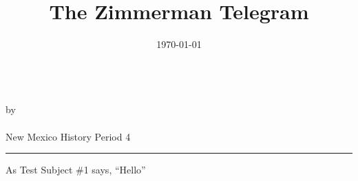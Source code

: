 \documentclass[12pt]{article}
\newcommand{\PutTitle}[1]
{
    \begin{center}
        {\huge\bfseries\thetitle}\\
        by \theauthor\\
        \thedate\\
        #1        
    \end{center}
    \hrule
    \vspace{2ex}
}
\begin{document}
\title{The Zimmerman Telegram}
\date{\today}
\PutTitle{New Mexico History Period 4}

As Test Subject \#1 says, ``Hello''\autocite{ZimmermanTelegram}

\pagestyle{headings}
\newpage

\printbibliography
\end{document}
